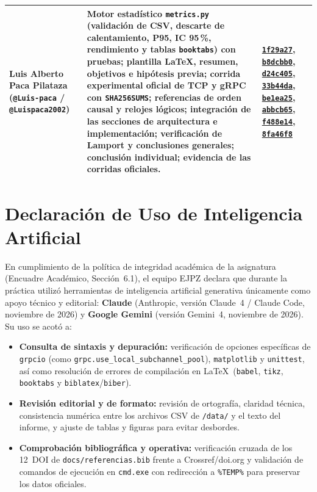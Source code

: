 \documentclass[12pt,a4paper]{article}
\newcommand{\commit}[1]{\href{https://github.com/Heiner-ZZZ/GA-SUM-02-PE-U1-Comunicaci-n-entre-Procesos-Distribuidos-con-gRPC-y-Sockets-TCP/commit/#1}{\texttt{#1}}}
\begin{document}
\begin{table}[htbp]
\begin{tabular}{>{\raggedright\arraybackslash}p{3.4cm}>{\raggedright\arraybackslash}p{7.1cm}>{\raggedright\arraybackslash}p{4.3cm}}
\midrule
Luis Alberto Paca Pilataza (\texttt{@Luis-paca} / \texttt{@Luispaca2002}) &
Motor estadístico \texttt{metrics.py} (validación de CSV, descarte de calentamiento, P95, IC 95\,\%, rendimiento y tablas \texttt{booktabs}) con pruebas; plantilla LaTeX, resumen, objetivos e hipótesis previa; corrida experimental oficial de TCP y gRPC con \texttt{SHA256SUMS}; referencias de orden causal y relojes lógicos; integración de las secciones de arquitectura e implementación; verificación de Lamport y conclusiones generales; conclusión individual; evidencia de las corridas oficiales. &
\commit{1f29a27}, \commit{b8dcbb0}, \commit{d24c405}, \commit{33b44da}, \commit{be1ea25}, \commit{abbcb65}, \commit{f488e14}, \commit{8fa46f8} \\
\bottomrule
\end{tabular}
\end{table}

\section{Declaración de Uso de Inteligencia Artificial}
\label{sec:declaracion_ia}

En cumplimiento de la política de integridad académica de la asignatura (Encuadre Académico, Sección~6.1), el equipo EJPZ declara que durante la práctica utilizó herramientas de inteligencia artificial generativa únicamente como apoyo técnico y editorial: \textbf{Claude} (Anthropic, versión Claude~4 / Claude Code, noviembre de 2026) y \textbf{Google Gemini} (versión Gemini~4, noviembre de 2026). Su uso se acotó a:

\begin{itemize}
  \item \textbf{Consulta de sintaxis y depuración:} verificación de opciones específicas de \texttt{grpcio} (como \texttt{grpc.use\_local\_subchannel\_pool}), \texttt{matplotlib} y \texttt{unittest}, así como resolución de errores de compilación en \LaTeX\ (\texttt{babel}, \texttt{tikz}, \texttt{booktabs} y \texttt{biblatex}/\texttt{biber}).
  \item \textbf{Revisión editorial y de formato:} revisión de ortografía, claridad técnica, consistencia numérica entre los archivos CSV de \texttt{/data/} y el texto del informe, y ajuste de tablas y figuras para evitar desbordes.
  \item \textbf{Comprobación bibliográfica y operativa:} verificación cruzada de los 12~DOI de \texttt{docs/referencias.bib} frente a Crossref/doi.org y validación de comandos de ejecución en \texttt{cmd.exe} con redirección a \texttt{\%TEMP\%} para preservar los datos oficiales.
\end{itemize}
\end{document}
